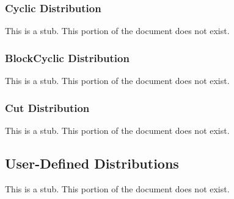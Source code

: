 \subsubsection{Cyclic Distribution}
\label{Cyclic_Distribution}

This is a stub.  This portion of the document does not exist.

\subsubsection{BlockCyclic Distribution}
\label{BlockCyclic_Distribution}

This is a stub.  This portion of the document does not exist.

\subsubsection{Cut Distribution}
\label{Cut_Distribution}

This is a stub.  This portion of the document does not exist.

\subsection{User-Defined Distributions}
\label{User-Defined_Distributions}

This is a stub.  This portion of the document does not exist.
